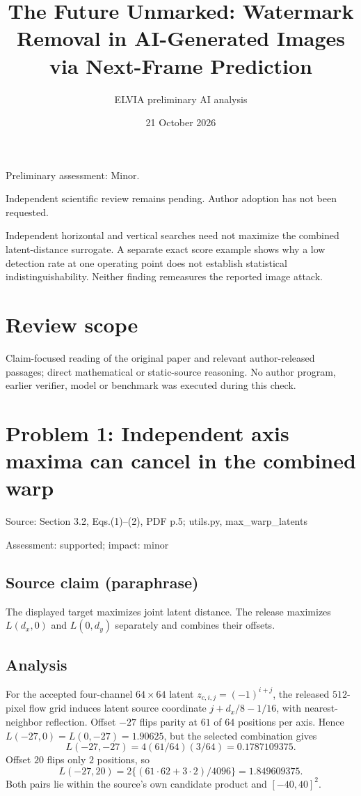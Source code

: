 \documentclass[11pt]{article}
\begin{document}
\title{The Future Unmarked: Watermark Removal in AI-Generated Images via Next-Frame Prediction}

\author{ELVIA preliminary AI analysis}\date{21 October 2026}\maketitle

Preliminary assessment: Minor.\par

Independent scientific review remains pending. Author adoption has not been requested.

Independent horizontal and vertical searches need not maximize the combined latent-distance surrogate. A separate exact score example shows why a low detection rate at one operating point does not establish statistical indistinguishability. Neither finding remeasures the reported image attack.

\section*{Review scope}

Claim-focused reading of the original paper and relevant author-released passages; direct mathematical or static-source reasoning. No author program, earlier verifier, model or benchmark was executed during this check.

\section*{Problem 1: Independent axis maxima can cancel in the combined warp}

Source: Section 3.2, Eqs.(1)–(2), PDF p.5; utils.py, max\_warp\_latents

Assessment: supported; impact: minor

\subsection*{Source claim (paraphrase)}

The displayed target maximizes joint latent distance. The release maximizes \(L(d_x,0)\) and \(L(0,d_y)\) separately and combines their offsets.

\subsection*{Analysis}

For the accepted four-channel \(64\times64\) latent \(z_{c,i,j}=(-1)^{i+j}\), the released \(512\)-pixel flow grid induces latent source coordinate \(j+d_x/8-1/16\), with nearest-neighbor reflection. Offset \(-27\) flips parity at \(61\) of \(64\) positions per axis. Hence \(L(-27,0)=L(0,-27)=1.90625\), but the selected combination gives \[L(-27,-27)=4(61/64)(3/64)=0.1787109375.\] Offset \(20\) flips only \(2\) positions, so \[L(-27,20)=2\{(61\cdot62+3\cdot2)/4096\}=1.849609375.\] Both pairs lie within the source’s own candidate product and \([-40,40]^2\).
\end{document}
